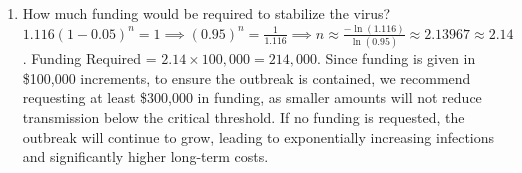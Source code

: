 \documentclass[11pt]{article}
\begin{document}
\begin{enumerate}
\begin{enumerate}
    \item[(d)] How much funding would be required to stabilize the virus?
{\color{blue}
 $1.116(1 - 0.05)^n = 1 \implies (0.95)^n = \frac{1}{1.116} \implies n \approx  \frac{-\ln(1.116)}{\ln(0.95)} \approx 2.13967 \approx 2.14$.
 Funding Required = $2.14 \times 100{,}000 = 214{,}000$. Since funding is given in \$100{,}000 increments, to ensure the outbreak is contained, we recommend requesting at least \$300{,}000 in funding, as smaller amounts will not reduce transmission below the critical threshold. If no funding is requested, the outbreak will continue to grow, leading to exponentially increasing infections and significantly higher long-term costs.
}   
\vspace{3cm}


\end{enumerate}

\end{enumerate}
\end{document}
